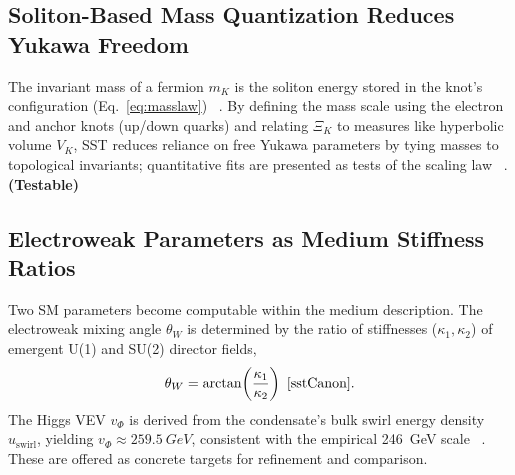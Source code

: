 \documentclass[10pt,reprint,aps,onecolumn,nofootinbib]{revtex4-2}
\newcommand{\testable}{\textbf{(Testable)}}
\begin{document}
        \subsection*{Soliton-Based Mass Quantization Reduces Yukawa Freedom}
            The invariant mass of a fermion $m_K$ is the soliton energy stored in the knot’s configuration (Eq.~\ref{eq:masslaw})~ \cite{sstLagrangian}. By defining the mass scale using the electron and anchor knots (up/down quarks) and relating $\Xi_K$ to measures like hyperbolic volume $V_K$, SST reduces reliance on free Yukawa parameters by tying masses to topological invariants; quantitative fits are presented as tests of the scaling law~ \cite{sstLagrangian}. \testable

        \subsection*{Electroweak Parameters as Medium Stiffness Ratios}
            Two SM parameters become computable within the medium description. The electroweak mixing angle $\theta_W$ is determined by the ratio of stiffnesses ($\kappa_1,\kappa_2$) of emergent U(1) and SU(2) director fields,
            \[
                \theta_W = \arctan\!\left(\frac{\kappa_1}{\kappa_2}\right)~ \cite{sstCanon}.
            \]
            The Higgs VEV $v_\Phi$ is derived from the condensate’s bulk swirl energy density $u_{\text{swirl}}$, yielding $v_\Phi \approx \SI{259.5}{GeV}$, consistent with the empirical \SI{246}{GeV} scale~ \cite{sstCanon}. These are offered as concrete targets for refinement and comparison.
\end{document}
